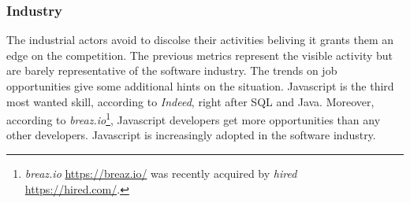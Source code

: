 \begin{figure}[h!]
\end{figure}

\begin{figure}[h!]
\end{figure}

\subsubsection{Industry}

The industrial actors avoid to discolse their activities beliving it grants them an edge on the competition.
The previous metrics represent the visible activity but are barely representative of the software industry.
The trends on job opportunities give some additional hints on the situation.
Javascript is the third most wanted skill, according to \textit{Indeed}, right after SQL and Java.
Moreover, according to \textit{breaz.io}\footnote{\textit{breaz.io} \url{https://breaz.io/} was recently acquired by \textit{hired} \url{https://hired.com/}.}, Javascript developers get more opportunities than any other developers.
Javascript is increasingly adopted in the software industry.

\separator

